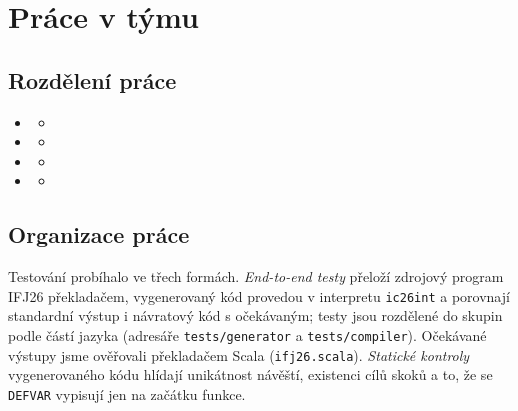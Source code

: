 \documentclass[11pt]{article}
\newif\ifdraft
\newcommand{\todo}[1]{\ifdraft{\color{red}\textbf{[TODO: #1]}}\fi}
\newcommand{\file}[1]{\texttt{#1}}                   %
\newcommand{\ic}[1]{\texttt{#1}}                     %
\begin{document}
\section{Práce v týmu}
\todo{stručně: jak jsme si práci naplánovali, jak se plnily termíny, kdy jsme spolupracovali (rozhraní mezi moduly, párové programování)}

\subsection{Rozdělení práce}

\begin{itemize}
  \item \todo{Jméno (login)}
    \begin{itemize}
      \item \todo{např.\ lexikální analýza, diagram konečného automatu, \ldots}
    \end{itemize}
  \item \todo{Jméno (login)}
    \begin{itemize}
      \item \todo{např.\ syntaktická analýza, precedenční analýza, LL gramatika a tabulka, \ldots}
    \end{itemize}
  \item \todo{Jméno (login)}
    \begin{itemize}
      \item \todo{např.\ tabulka symbolů, sémantické kontroly, \ldots}
    \end{itemize}
  \item \todo{Jméno (login)}
    \begin{itemize}
      \item \todo{např.\ generátor cílového kódu, testovací sada, dokumentace, \ldots}
    \end{itemize}
\end{itemize}

\todo{povinně zdůvodnit odchylky od rovnoměrného rozdělení bodů, pokud nastaly}

\subsection{Organizace práce}

\todo{verzovací systém, větve, pull requesty, kolik schválení se vyžaduje, kultura code review}

Testování probíhalo ve třech formách. \emph{End-to-end testy} přeloží zdrojový program IFJ26 překladačem, vygenerovaný kód provedou v interpretu \file{ic26int} a porovnají standardní výstup i návratový kód s očekávaným; testy jsou rozdělené do skupin podle částí jazyka (adresáře \file{tests/generator} a \file{tests/compiler}). Očekávané výstupy jsme ověřovali překladačem Scala (\file{ifj26.scala}). \emph{Statické kontroly} vygenerovaného kódu hlídají unikátnost návěští, existenci cílů skoků a to, že se \ic{DEFVAR} vypisují jen na začátku funkce. \todo{další formy testování}
\end{document}
